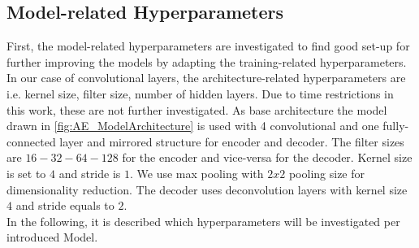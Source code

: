 \documentclass[12pt,DIV14,BCOR12mm,a4paper,footexclude,headinclude,halfparskip-,twoside,openright,cleardoubleempty,idxtotoc,bibtotoc,listtotoc]{scrreprt} %
\numberwithin{equation}{chapter}
\begin{document}
\subsection{Model-related Hyperparameters}\label{subsec:Model-related Hyperparameters}
First, the model-related hyperparameters are investigated to find good set-up for further improving the models by adapting the training-related hyperparameters. In our case of convolutional layers, the architecture-related hyperparameters are i.e. kernel size, filter size, number of hidden layers. Due to time restrictions in this work, these are not further investigated. As base architecture the model drawn in \ref{fig:AE_ModelArchitecture} is used with 4 convolutional and one fully-connected layer and mirrored structure for encoder and decoder. The filter sizes are $16-32-64-128$ for the encoder and vice-versa for the decoder. Kernel size is set to $4$ and stride is $1$. We use max pooling with $2x2$ pooling size for dimensionality reduction. The decoder uses deconvolution layers with kernel size $4$ and stride equals to $2$.\\
In the following, it is described which hyperparameters will be investigated per introduced Model.
\end{document}
